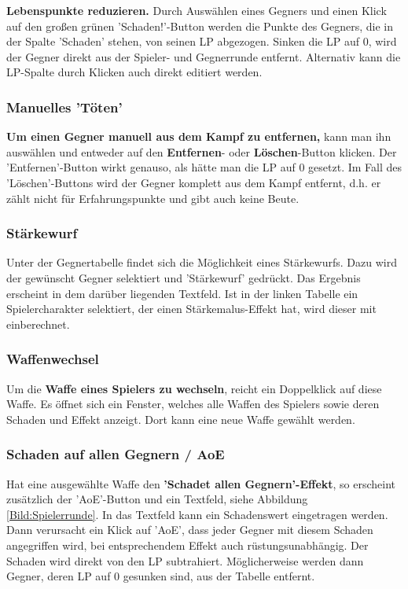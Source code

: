 \documentclass[11pt, a4paper, german]{article}
\begin{document}
\textbf{Lebenspunkte reduzieren.} Durch Auswählen eines Gegners und einen Klick auf den großen grünen 'Schaden!'-Button werden die Punkte des Gegners, die in der Spalte 'Schaden' stehen, von seinen LP abgezogen. Sinken die LP auf 0, wird der Gegner direkt aus der Spieler- und Gegnerrunde entfernt. Alternativ kann die LP-Spalte durch Klicken auch direkt editiert werden.

\subsubsection{Manuelles 'Töten'}

\textbf{Um einen Gegner manuell aus dem Kampf zu entfernen,} kann man ihn auswählen und entweder auf den \textbf{Entfernen}- oder \textbf{Löschen}-Button klicken. Der 'Entfernen'-Button wirkt genauso, als hätte man die LP auf 0 gesetzt. Im Fall des 'Löschen'-Buttons wird der Gegner komplett aus dem Kampf entfernt, d.h. er zählt nicht für Erfahrungspunkte und gibt auch keine Beute.

\subsubsection{Stärkewurf}
Unter der Gegnertabelle findet sich die Möglichkeit eines Stärkewurfs. Dazu wird der gewünscht Gegner selektiert und 'Stärkewurf' gedrückt. Das Ergebnis erscheint in dem darüber liegenden Textfeld. Ist in der linken Tabelle ein Spielercharakter selektiert, der einen Stärkemalus-Effekt hat, wird dieser mit einberechnet.

\subsubsection{Waffenwechsel}
Um die \textbf{Waffe eines Spielers zu wechseln}, reicht ein Doppelklick auf diese Waffe. Es öffnet sich ein Fenster, welches alle Waffen des Spielers sowie deren Schaden und Effekt anzeigt. Dort kann eine neue Waffe gewählt werden.

\subsubsection{Schaden auf allen Gegnern / AoE}
Hat eine ausgewählte Waffe den \textbf{'Schadet allen Gegnern'-Effekt}, so erscheint zusätzlich der 'AoE'-Button und ein Textfeld, siehe Abbildung \ref{Bild:Spielerrunde}. In das Textfeld kann ein Schadenswert eingetragen werden. Dann verursacht ein Klick auf 'AoE', dass jeder Gegner mit diesem Schaden angegriffen wird, bei entsprechendem Effekt auch rüstungsunabhängig. Der Schaden wird direkt von den LP subtrahiert. Möglicherweise werden dann Gegner, deren LP auf 0 gesunken sind, aus der Tabelle entfernt.
\end{document}
